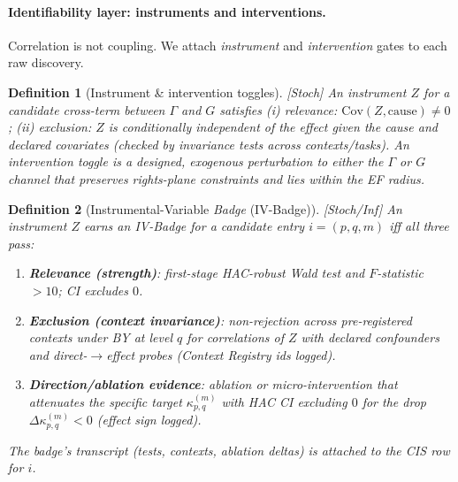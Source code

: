 \documentclass[10pt]{article}
\newcommand{\cutq}{q}
\newcommand{\layertag}[1]{\textup{[#1]}}
\newtheorem{definition}{Definition}
\begin{document}
\paragraph{Identifiability layer: instruments and interventions.}
Correlation is not coupling. We attach \emph{instrument} and \emph{intervention} gates to each raw discovery.

\begin{definition}[Instrument \& intervention toggles]\label{def:inst-int}
\emph{\layertag{Stoch}}
An \emph{instrument} $Z$ for a candidate cross-term between $\Gamma$ and $G$ satisfies (i) \emph{relevance}:
$\mathrm{Cov}(Z,\text{cause})\neq 0$; (ii) \emph{exclusion}: $Z$ is conditionally independent of the \emph{effect} given the cause and declared covariates (checked by invariance tests across contexts/tasks).
An \emph{intervention toggle} is a designed, exogenous perturbation to either the $\Gamma$ or $G$ channel that preserves rights-plane constraints and lies within the EF radius.
\end{definition}

\begin{definition}[Instrumental-Variable \emph{Badge} (IV-Badge)]\label{def:iv-badge}
\emph{\layertag{Stoch/Inf}}
An instrument $Z$ earns an \textsf{IV-Badge} for a candidate entry $i\!=\!(p,q,m)$ iff all three pass:
\begin{enumerate}[leftmargin=*,itemsep=2pt]
\item \textbf{Relevance (strength)}: first-stage HAC-robust Wald test and $F$-statistic $>10$; CI excludes $0$.
\item \textbf{Exclusion (context invariance)}: non-rejection across pre-registered contexts under BY at level $\cutq$ for correlations of $Z$ with declared confounders and direct-$\to$effect probes (Context Registry ids logged).
\item \textbf{Direction/ablation evidence}: ablation or micro-intervention that attenuates the specific target $\kappa_{p,q}^{(m)}$ with HAC CI excluding $0$ for the drop $\Delta\kappa_{p,q}^{(m)}<0$ (effect sign logged).
\end{enumerate}
The badge’s transcript (tests, contexts, ablation deltas) is attached to the CIS row for $i$.
\end{definition}
\end{document}
